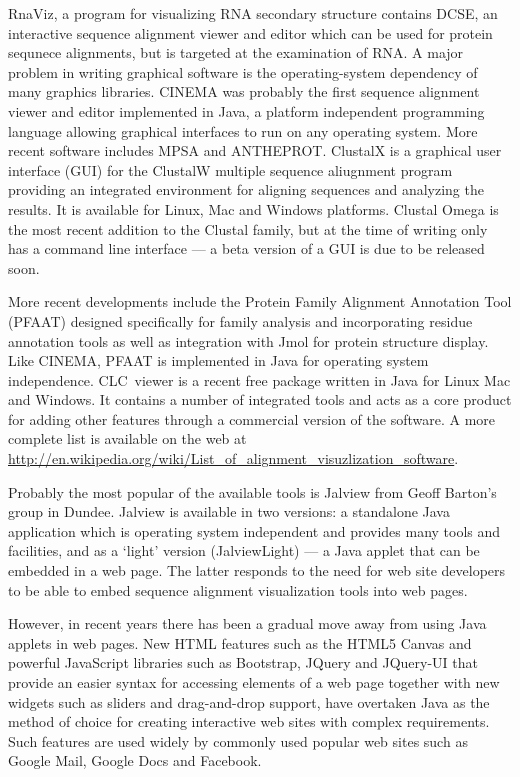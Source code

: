 \documentclass[a4]{bioinfo}
\begin{document}
RnaViz\cite{derijk:rnaviz}, a program for visualizing RNA
secondary structure contains DCSE\cite{derijk:dcse}, an interactive
sequence alignment viewer and editor which can be used for protein
sequnece alignments, but is targeted at the examination of RNA. A
major problem in writing graphical software is the operating-system
dependency of many graphics libraries. CINEMA\cite{parrysmith:cinema}
was probably the first sequence alignment viewer and editor
implemented in Java, a platform independent programming language
allowing graphical interfaces to run on any operating system. More
recent software includes MPSA\cite{blanchet:mpsa} and ANTHEPROT\cite{deleage:antheprot}.
ClustalX\cite{thompson:clustalx} is a graphical user interface (GUI)
for the ClustalW multiple sequence aliugnment program providing an
integrated environment for aligning sequences and analyzing the
results. It is available for Linux, Mac and Windows platforms. Clustal
Omega is the most recent addition to the Clustal family, but at the
time of writing only has a command line interface --- a beta version
of a GUI is due to be released soon.

More recent developments include the Protein Family Alignment
Annotation Tool (PFAAT)\cite{johnson:pfaat} designed specifically for
family analysis and incorporating residue annotation tools as well as
integration with Jmol for protein structure display. Like CINEMA,
PFAAT is implemented in Java for operating system
independence. CLC~viewer is a recent free package written in Java for
Linux Mac and Windows. It contains a number of integrated tools and
acts as a core product for adding other features through a commercial
version of the software. A more
complete list is available on the web at
\url{http://en.wikipedia.org/wiki/List_of_alignment_visuzlization_software}.

Probably the most popular of the available tools is Jalview from Geoff
Barton's group in Dundee\cite{clamp:jalview}. Jalview is available in
two versions: a standalone Java application which is operating system
independent and provides many tools and facilities, and as a `light'
version (JalviewLight) --- a Java applet that can be embedded in a web
page. The latter responds to the need for web site developers to be
able to embed sequence alignment visualization tools into web pages.

However, in recent years there has been a gradual move away from using
Java applets in web pages. New HTML features such as the HTML5 Canvas
and powerful JavaScript libraries such as Bootstrap, JQuery and
JQuery-UI that provide an easier syntax for accessing elements of a
web page together with new widgets such as sliders and drag-and-drop
support, have overtaken Java as the method of choice for creating
interactive web sites with complex requirements. Such features are
used widely by commonly used popular web sites such as Google Mail,
Google Docs and Facebook.
\end{document}
